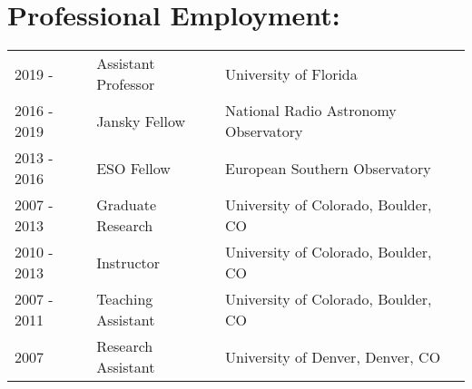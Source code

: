 \begin{minipage}{\textwidth}
\setlength{\extrarowheight}{2pt}
\section*{Professional Employment:}
\begin{listliketab}
    \begin{tabular}{lll}
    2019 -      & Assistant Professor & University of Florida \\
    2016 - 2019 & Jansky Fellow  & National Radio Astronomy Observatory\\
    2013 - 2016 & ESO Fellow  & European Southern Observatory\\
    2007 - 2013 & Graduate Research & University of Colorado, Boulder, CO \\
    2010 - 2013 & Instructor  & University of Colorado, Boulder, CO \\
    2007 - 2011 & Teaching Assistant & University of Colorado, Boulder, CO \\
    2007 & Research Assistant & University of Denver, Denver, CO \\
    \end{tabular}
\end{listliketab}

\end{minipage}

